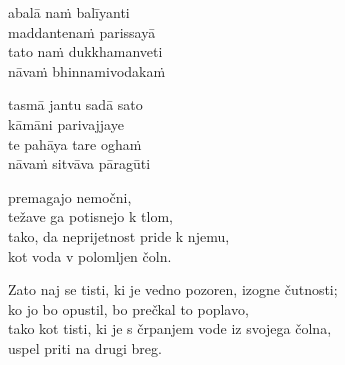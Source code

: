 
\clearpage

abalā naṁ balīyanti\\
maddantenaṁ parissayā\\
tato naṁ dukkhamanveti\\
nāvaṁ bhinnamivodakaṁ

tasmā jantu sadā sato\\
kāmāni parivajjaye\\
te pahāya tare oghaṁ\\
nāvaṁ sitvāva pāragūti


\clearpage

premagajo nemočni,\\
težave ga potisnejo k tlom,\\
tako, da neprijetnost pride k njemu,\\
kot voda v polomljen čoln.

Zato naj se tisti, ki je vedno pozoren, izogne čutnosti;\\
ko jo bo opustil, bo prečkal to poplavo,\\
tako kot tisti, ki je s črpanjem vode iz svojega čolna,\\
uspel priti na drugi breg.

